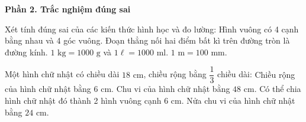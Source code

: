 \textbf{Phần 2. Trắc nghiệm đúng sai}

\begin{ex} %
Xét tính đúng sai của các kiến thức hình học và đo lường:
\choiceTF
{\True Hình vuông có 4 cạnh bằng nhau và 4 góc vuông.}
{Đoạn thẳng nối hai điểm bất kì trên đường tròn là đường kính.}
{\True $1\text{ kg} = 1000\text{ g}$ và $1\ell = 1000\text{ ml}$.}
{$1\text{ m} = 100\text{ mm}$.}
\end{ex}

\begin{ex} %
Một hình chữ nhật có chiều dài $18\text{ cm}$, chiều rộng bằng $\dfrac{1}{3}$ chiều dài:
\choiceTF
{\True Chiều rộng của hình chữ nhật bằng $6\text{ cm}$.}
{\True Chu vi của hình chữ nhật bằng $48\text{ cm}$.}
{Có thể chia hình chữ nhật đó thành 2 hình vuông cạnh $6\text{ cm}$.}
{\True Nửa chu vi của hình chữ nhật bằng $24\text{ cm}$.}
\end{ex}

